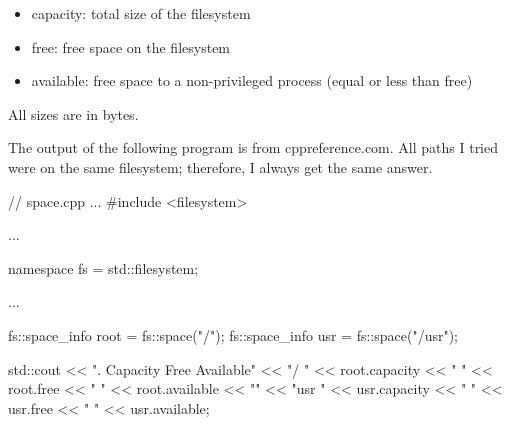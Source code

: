 \begin{itemize}
\item 
capacity: total size of the filesystem

\item 
free: free space on the filesystem

\item 
available: free space to a non-privileged process (equal or less than free)
\end{itemize}

All sizes are in bytes.

The output of the following program is from cppreference.com. All paths I tried were on the same filesystem; therefore, I always get the same answer.


\begin{cpp}
// space.cpp
...
#include <filesystem>

...

namespace fs = std::filesystem;

...

fs::space_info root = fs::space("/");
fs::space_info usr = fs::space("/usr");

std::cout << ". Capacity Free Available\n"
		  << "/ " << root.capacity << " "
		  << root.free << " " << root.available << "\n"
		  << "usr " << usr.capacity << " "
		  << usr.free << " " << usr.available;
\end{cpp}














